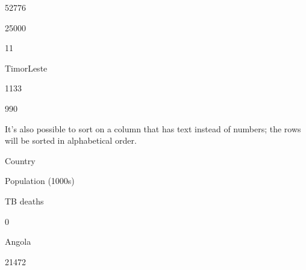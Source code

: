 \documentclass[letterpaper,10pt,english]{sphinxmanual}
\begin{document}
52776





25000









11





Timor\sphinxhyphen{}Leste





1133





990









It’s also possible to sort on a column that has text instead of numbers; the rows will be sorted in alphabetical order.




















Country





Population (1000s)





TB deaths









0





Angola





21472
\end{document}
